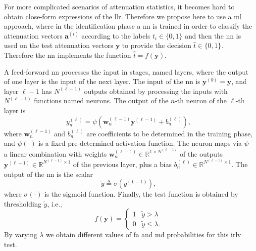 \documentclass[conference,draftcls,onecolumn]{IEEEtran}
\begin{document}
For more complicated scenarios of attenuation statistics, it becomes hard to obtain close-form expressions of the \ac{llr}. Therefore we propose here to use a \ac{ml} approach, where in the identification phase a \ac{nn} is trained in order to classify the attenuation vectors $\bm{a}^{(i)}$ according to the labels $t_i \in \{0,1\}$ and then the \ac{nn} is used on the test attenuation vectors $\bm{y}$ to provide the decision $\hat{t} \in \{0,1\}$. Therefore the \ac{nn} implements the function $\hat{t} = f(\bm{y})$.

A feed-forward \ac{nn} processes the input in stages, named layers, where the output of one layer is the input of the next layer. The input of the \ac{nn} is $\bm{y}^{(0)} = \bm{y}$, and layer $\ell-1$ has $N^{(\ell-1)}$ outputs obtained by processing the inputs with $N^{(\ell-1)}$ functions named neurons. The output of the $n$-th neuron of the $\ell$-th layer is
\begin{equation}\label{eq:nonLin}
y_n^{(\ell)} = \psi\left( \bm{w}_n^{(\ell -1)}\bm{y}^{(\ell-1)}+b_n^{(\ell)} \right),
\end{equation}
where $\bm{w}_n^{(\ell -1)}$ and $b_n^{(\ell)}$ are coefficients to be determined in the training phase, and $\psi(\cdot)$ is a fixed pre-determined activation function. The neuron maps via  $\psi$ a  linear combination with weights $\bm{w}_n^{(\ell -1)}\in \mathbb{R}^{1\times N^{(\ell-1)}}$ of the outputs $\bm{y}^{(\ell-1)} \in \mathbb{R}^{N^{(\ell-1)} \times 1 }$ of the previous layer, plus a bias $b_n^{(\ell)} \in \mathbb{R}^{N^{(\ell-1)} \times 1 }$. The output of the \ac{nn} is the scalar 
\begin{equation}
	\tilde{y} \triangleq \sigma(y^{(L-1)}),	
\end{equation}
where $\sigma(\cdot)$ is the sigmoid function. Finally, the test function is obtained by thresholding $\tilde{y}$, i.e.,
\begin{equation}
\label{eq:decNN}
    f(\bm{y}) = \begin{cases}
    1 & \tilde{y} > \lambda \\
    0 & \tilde{y} \leq \lambda.
    \end{cases}
\end{equation}
By varying $\lambda$ we obtain different values of \ac{fa} and \ac{md} probabilities for this \ac{irlv} test.
\end{document}
